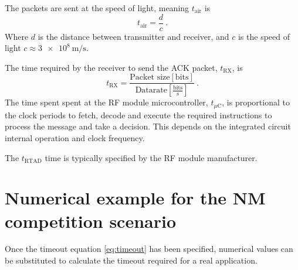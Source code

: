 The packets are sent at the speed of light, meaning $t_{\text{air}}$ is
\begin{equation}
	t_{\text{air}} = \frac{d}{c} \ .
\end{equation}
Where $d$ is the distance between transmitter and receiver, and $c$ is the speed of light $c \approx \SI{3e8}{\m\per\s}$.

The time required by the receiver to send the ACK packet, $t_{\text{RX}}$, is 
\begin{equation}
	t_{\text{RX}} = \frac{\text{Packet size} \left[\text{bits} \right]}{ \text{Datarate} \left[\frac{\text{bits}}{\text{s}} \right]}  \ .
\end{equation}
The time spent spent at the RF module microcontroller, $t_{\mu \text{C}}$, is proportional to the clock periods to fetch, decode and execute the required instructions to process the message and take a decision. This depends on the integrated circuit internal operation and clock frequency.

The $t_{\text{RTAD}}$ time is typically specified by the RF module manufacturer.



\section{Numerical example for the NM competition scenario}
Once the timeout equation \eqref{eq:timeout} has been specified, numerical values can be substituted to calculate the timeout required for a real application.

